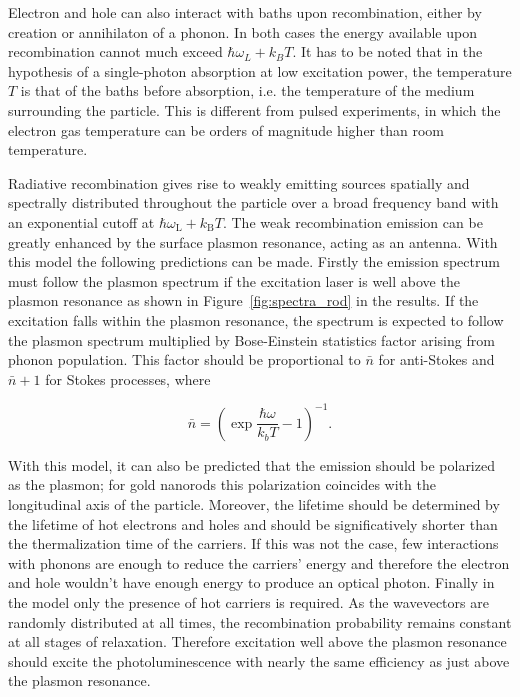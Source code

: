 Electron and hole can also interact with baths upon recombination, either by
creation or annihilaton of a phonon. In both cases the energy available upon
recombination cannot much exceed $\hbar\omega_L+k_BT$. It has to be noted that
in the hypothesis of a single-photon absorption at low excitation power, the
temperature $T$ is that of the baths before absorption, i.e. the temperature of
the medium surrounding the particle. This is different from pulsed experiments,
in which the electron gas temperature can be orders of magnitude higher than
room temperature\cite{Baffou2013a}. 

Radiative recombination gives rise to weakly emitting sources spatially and
spectrally distributed throughout the particle over a broad frequency band with
an exponential cutoff at $\hbar\omega_\textrm{L}+k_\textrm{B}T$. The weak
recombination emission can be greatly enhanced by the surface plasmon resonance,
acting as an antenna. With this model the following predictions can be made.
Firstly the emission spectrum must follow the plasmon spectrum if the excitation
laser is well above the plasmon resonance as shown in \mbox{Figure
\ref{fig:spectra_rod}} in the results. If the excitation falls within the
plasmon resonance, the spectrum is expected to follow the plasmon spectrum multiplied by
Bose-Einstein statistics factor arising from phonon population.
This factor should be proportional to $\bar{n}$ for anti-Stokes and $\bar{n}+1$
for Stokes processes, where

\begin{equation}
	\bar{n}=\left(\exp\frac{\hbar\omega}{k_bT}-1\right)^{-1}.
\end{equation}

With this model, it can also be predicted that the emission should be polarized
as the plasmon; for gold nanorods this polarization coincides with the
longitudinal axis of the particle\cite{He2015}. Moreover, the lifetime should be
determined by the lifetime of hot electrons and holes and should be
significatively shorter than the thermalization time of the carriers. If this
was not the case, few interactions with phonons are enough to reduce the
carriers' energy and therefore the electron and hole wouldn't have enough energy
to produce an optical photon. Finally in the model only the presence of hot
carriers is required. As the wavevectors are randomly distributed at all times,
the recombination probability remains constant at all stages of relaxation.
Therefore excitation well above the plasmon resonance should excite the
photoluminescence with nearly the same efficiency as just above the plasmon
resonance.

